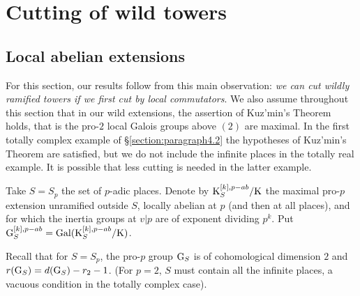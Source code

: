 \documentclass[12pt,a4paper,twoside,english]{smfart}
\def\G{{\rm G}}
\def\K{{\rm K}}
\def\Gal{{\rm Gal}}
\begin{document}




\section{Cutting of wild towers}
  
  \subsection{Local abelian extensions}
   \label{section:principle}
  
 For this section, our results follow from this main observation: {\it we can cut  wildly ramified towers if  we first cut by local commutators}.
  We also assume throughout this section that in our wild extensions, the assertion of Kuz'min's Theorem holds, that is
 the  pro-$2$ local Galois groups above $(2)$ are maximal. In the first totally complex example  of \S \ref{section:paragraph4.2} the hypotheses of Kuz'min's Theorem 
 are satisfied, but we do not include the infinite places in the totally real example. It is possible that less cutting is needed
 in the latter example.
 
  
  \begin{defi} Take $S=S_p$ the set of $p$-adic places.
  Denote by $\K_S^{{[k],p-ab}}/\K$ the maximal pro-$p$ extension unramified outside $S$, locally abelian at $p$ (and then at all places),  and for which  the inertia groups at $v|p$ are  of exponent dividing $p^k$. Put $\G_S^{{[k],p-ab}}=\Gal(\K_S^{{[k],p-ab}}/\K)$.
  \end{defi}
  
  Recall that for $S=S_p$, the pro-$p$ group $\G_S$ is of cohomological dimension $2$ and $r(\G_S)=d(\G_S)-r_2-1$. (For $p=2$, $S$ must
  contain all the infinite places, a vacuous condition in the totally complex case).%
  
  
  
  \
  
  
\end{document}
